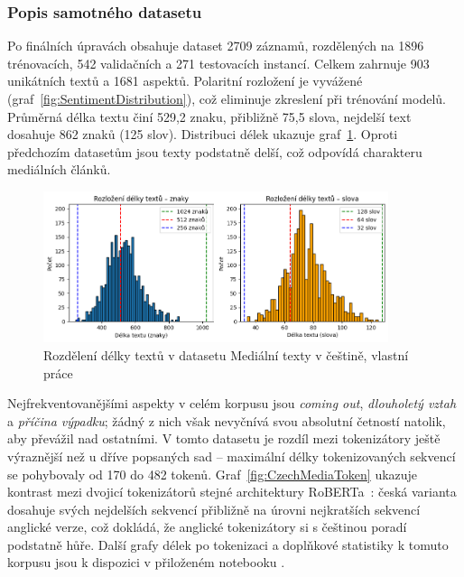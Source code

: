 \subsubsection{Popis samotného datasetu}
Po finálních úpravách obsahuje dataset 2709 záznamů, rozdělených na 1896 trénovacích, 542 validačních a 271 testovacích instancí. Celkem zahrnuje 903 unikátních textů a 1681 aspektů. Polaritní rozložení je vyvážené (graf~\ref{fig:SentimentDistribution}), což eliminuje zkreslení při trénování modelů. Průměrná délka textu činí 529,2 znaku, přibližně 75,5 slova, nejdelší text dosahuje 862 znaků (125 slov). Distribuci délek ukazuje graf~\ref{fig:CzechMediaLenDistribution}. Oproti předchozím datasetům jsou texty podstatně delší, což odpovídá charakteru mediálních článků.

\begin{figure}[ht]
    \centering
    \includegraphics[width=0.9\textwidth]{images/Czechmedia-distribution}
    \caption[Rozdělení délky textů v datasetu Mediální texty v češtině]%
    {Rozdělení délky textů v datasetu Mediální texty v češtině, vlastní práce}
    \label{fig:CzechMediaLenDistribution}
\end{figure}

Nejfrekventovanějšími aspekty v celém korpusu jsou \emph{coming out}, \emph{dlouholetý vztah} a \emph{příčina výpadku}; žádný z nich však nevyčnívá svou absolutní četností natolik, aby převážil nad ostatními. V tomto datasetu je rozdíl mezi tokenizátory ještě výraznější než u dříve popsaných sad -- maximální délky tokenizovaných sekvencí se pohybovaly od 170 do 482 tokenů. Graf~\ref{fig:CzechMediaToken} ukazuje kontrast mezi dvojicí tokenizátorů stejné architektury RoBERTa~\cite{liu2019robertarobustlyoptimizedbert}: česká varianta dosahuje svých nejdelších sekvencí přibližně na úrovni nejkratších sekvencí anglické verze, což dokládá, že anglické tokenizátory si s češtinou poradí podstatně hůře. Další grafy délek po tokenizaci a doplňkové statistiky k tomuto korpusu jsou k dispozici v přiloženém notebooku .

